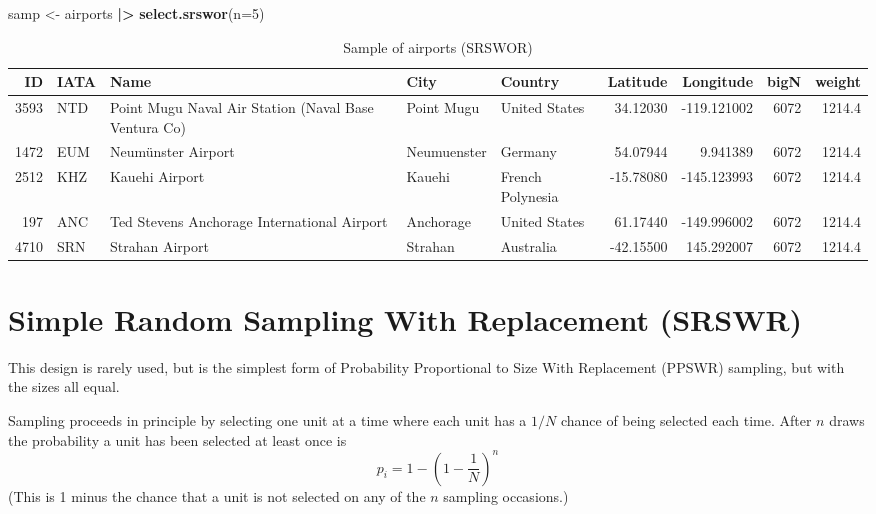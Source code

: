 \documentclass[
]{book}
\newenvironment{Shaded}{\begin{snugshade}}{\end{snugshade}}
\newcommand{\AttributeTok}[1]{\textcolor[rgb]{0.13,0.29,0.53}{#1}}
\newcommand{\DecValTok}[1]{\textcolor[rgb]{0.00,0.00,0.81}{#1}}
\newcommand{\FunctionTok}[1]{\textcolor[rgb]{0.13,0.29,0.53}{\textbf{#1}}}
\newcommand{\NormalTok}[1]{#1}
\newcommand{\OtherTok}[1]{\textcolor[rgb]{0.56,0.35,0.01}{#1}}
\newcommand{\SpecialCharTok}[1]{\textcolor[rgb]{0.81,0.36,0.00}{\textbf{#1}}}
\begin{document}
\begin{Shaded}
\begin{Highlighting}[]
\NormalTok{samp }\OtherTok{\textless{}{-}}\NormalTok{ airports }\SpecialCharTok{|\textgreater{}} \FunctionTok{select.srswor}\NormalTok{(}\AttributeTok{n=}\DecValTok{5}\NormalTok{)}
\end{Highlighting}
\end{Shaded}

\begin{table}
\centering
\caption{\label{tab:unnamed-chunk-68}Sample of airports (SRSWOR)}
\centering
\begin{tabular}[t]{r|l|l|l|l|r|r|r|r}
\hline
ID & IATA & Name & City & Country & Latitude & Longitude & bigN & weight\\
\hline
3593 & NTD & Point Mugu Naval Air Station (Naval Base Ventura Co) & Point Mugu & United States & 34.12030 & -119.121002 & 6072 & 1214.4\\
\hline
1472 & EUM & Neumünster Airport & Neumuenster & Germany & 54.07944 & 9.941389 & 6072 & 1214.4\\
\hline
2512 & KHZ & Kauehi Airport & Kauehi & French Polynesia & -15.78080 & -145.123993 & 6072 & 1214.4\\
\hline
197 & ANC & Ted Stevens Anchorage International Airport & Anchorage & United States & 61.17440 & -149.996002 & 6072 & 1214.4\\
\hline
4710 & SRN & Strahan Airport & Strahan & Australia & -42.15500 & 145.292007 & 6072 & 1214.4\\
\hline
\end{tabular}
\end{table}

\section{Simple Random Sampling With Replacement (SRSWR)}\label{simple-random-sampling-with-replacement-srswr}

This design is rarely used, but is the simplest form of Probability Proportional to Size
With Replacement (PPSWR) sampling, but with the sizes all equal.

Sampling proceeds in principle by selecting one unit at a time where each unit has a \(1/N\)
chance of being selected each time. After \(n\) draws the probability a unit has been selected
at least once is
\[
    p_i = 1 - \left(1-\frac{1}{N}\right)^n
\]
(This is 1 minus the chance that a unit is not selected on any of the \(n\) sampling occasions.)
\end{document}
